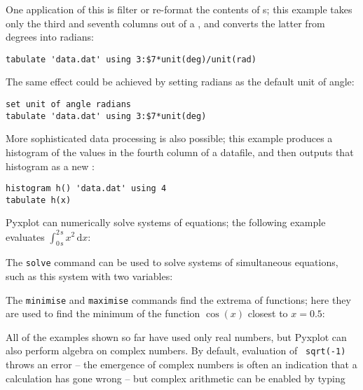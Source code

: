 \noindent One application of this is filter or re-format the contents of
\datafile s; this example takes only the third and seventh columns out of a
\datafile, and converts the latter from degrees into radians:

\begin{verbatim}
tabulate 'data.dat' using 3:$7*unit(deg)/unit(rad)
\end{verbatim}

\noindent The same effect could be achieved by setting radians as the default
unit of angle:

\begin{verbatim}
set unit of angle radians
tabulate 'data.dat' using 3:$7*unit(deg)
\end{verbatim}

\noindent More sophisticated data processing is also possible; this example
produces a histogram of the values in the fourth column of a datafile, and then
outputs that histogram as a new \datafile:

\begin{verbatim}
histogram h() 'data.dat' using 4
tabulate h(x)
\end{verbatim}


Pyxplot can numerically solve systems of equations; the following example
evaluates $\int_{0\,\mathrm{s}}^{2\,\mathrm{s}} x^2\,\mathrm{d}x$:

\vspace{3mm}

\vspace{3mm}

\noindent The {\tt solve} command can be used to solve systems of simultaneous equations, such as this system with two variables:

\vspace{3mm}

\vspace{3mm}

\noindent The {\tt minimise} and {\tt maximise} commands find the extrema of functions; here they are used to find the minimum of the function $\cos(x)$ closest to $x=0.5$:

\vspace{3mm}

\vspace{3mm}

All of the examples shown so far have used only real numbers, but Pyxplot can
also perform algebra on complex numbers. By default, evaluation of {\tt
sqrt(-1)} throws an error -- the emergence of complex numbers is often an
indication that a calculation has gone wrong -- but complex arithmetic can be
enabled by typing

